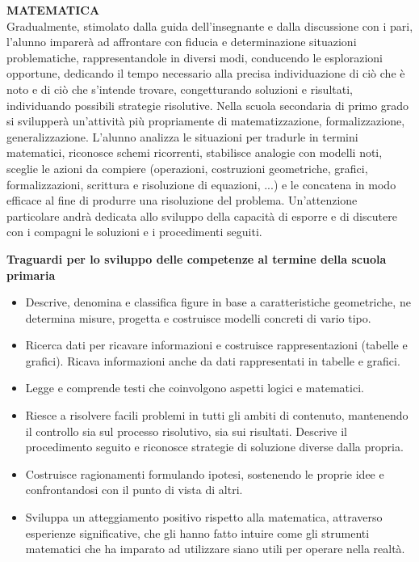 \documentclass[12pt]{report}
\begin{document}
\bigskip
\noindent \textbf{MATEMATICA}
\\
Gradualmente, stimolato dalla guida dell'insegnante e dalla discussione con i pari, l’alunno imparerà ad affrontare con fiducia e determinazione situazioni problematiche, rappresentandole in diversi modi, conducendo le esplorazioni opportune, dedicando il tempo necessario alla precisa individuazione di ciò che è noto e di ciò che s'intende trovare, congetturando soluzioni e risultati, individuando possibili strategie risolutive. Nella scuola secondaria di primo grado si svilupperà un'attività più propriamente di matematizzazione, formalizzazione, generalizzazione.
L'alunno analizza le situazioni per tradurle in termini matematici, riconosce schemi ricorrenti, stabilisce analogie con modelli noti, sceglie le azioni da compiere (operazioni, costruzioni geometriche, grafici, formalizzazioni, scrittura e risoluzione di equazioni, ...) e le concatena in modo efficace al fine di produrre una risoluzione del problema. Un’attenzione particolare andrà dedicata allo sviluppo della capacità di esporre e di discutere con i compagni le soluzioni e i procedimenti seguiti.


\bigskip
\textbf{Traguardi per lo sviluppo delle competenze al termine della scuola primaria}
\begin{itemize}
	\item Descrive, denomina e classifica figure in base a caratteristiche geometriche, ne determina misure, progetta e costruisce modelli concreti di vario tipo.
	\item Ricerca dati per ricavare informazioni e costruisce rappresentazioni (tabelle e grafici). Ricava informazioni anche da dati rappresentati in tabelle e grafici.
	\item Legge e comprende testi che coinvolgono aspetti logici e matematici.
	\item Riesce a risolvere facili problemi in tutti gli ambiti di contenuto, mantenendo il controllo sia sul processo risolutivo, sia sui risultati. Descrive il procedimento seguito e riconosce strategie di soluzione diverse dalla propria.
	\item Costruisce ragionamenti formulando ipotesi, sostenendo le proprie idee e confrontandosi con il punto di vista di altri.
	\item Sviluppa un atteggiamento positivo rispetto alla matematica, attraverso esperienze significative, che gli hanno fatto intuire come gli strumenti matematici che ha imparato ad utilizzare siano utili per operare nella realtà.
\end{itemize}
\end{document}

